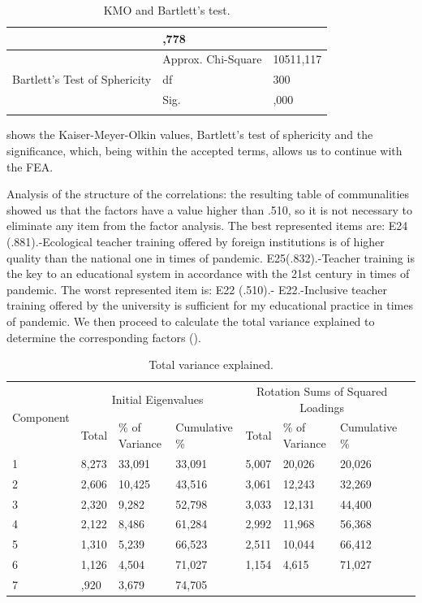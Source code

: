 \documentclass{textolivre}
\begin{document}
\begin{table}[htpb]
\caption{KMO and Bartlett's test.}
\label{tab2}
\centering
\begin{tabular}{p{}p{}p{}}
\toprule 
\arrayrulecolor[gray]{.7}
\multicolumn{2}{c}{Kaiser-Meyer-Olkin Measure of Sampling Adequacy.} & ,778
\\ 
\midrule
\multirow{3}{*}{Bartlett's Test of Sphericity} & Approx. Chi-Square & 10511,117 \\
\cmidrule{2-3}
& df & 300 \\
\cmidrule{2-3}
& Sig. & ,000
\\
\arrayrulecolor{black}
\bottomrule
\end{tabular}
\centering
\end{table}

 shows the Kaiser-Meyer-Olkin values, Bartlett's test of sphericity and the significance, which, being within the accepted terms, allows us to continue with the FEA.
 
Analysis of the structure of the correlations: the resulting table of communalities showed us that the factors have a value higher than .510, so it is not necessary to eliminate any item from the factor analysis. The best represented items are: E24 (.881).-Ecological teacher training offered by foreign institutions is of higher quality than the national one in times of pandemic.
E25(.832).-Teacher training is the key to an educational system in accordance with the 21st century in times of pandemic. The worst represented item is: E22 (.510).- E22.-Inclusive teacher training offered by the university is sufficient for my educational practice in times of pandemic. We then proceed to calculate the total variance explained to determine the corresponding factors ().

\begin{table}[htpb]
\caption{Total variance explained.}
\label{tab3}
\centering
\begin{tabular}{p{}lllllll}
\toprule 
\multirow{2}{*}{Component} & \multicolumn{3}{c}{Initial Eigenvalues} & \multicolumn{3}{c}{Rotation Sums of Squared Loadings} \\ 
\cmidrule{2-4} \cmidrule{5-7}
& Total & \% of Variance & Cumulative \% & Total & \% of Variance & Cumulative \%
\\
\midrule
1 & 8,273 & 33,091 & 33,091 & 5,007 & 20,026 & 20,026 \\
2 & 2,606 & 10,425 & 43,516 & 3,061 & 12,243 & 32,269 \\
3 & 2,320 & 9,282 & 52,798 & 3,033 & 12,131 & 44,400 \\
4 & 2,122 & 8,486 & 61,284 & 2,992 & 11,968 & 56,368 \\
5 & 1,310 & 5,239 & 66,523 & 2,511 & 10,044 & 66,412 \\
6 & 1,126 & 4,504 & 71,027 & 1,154 & 4,615 & 71,027 \\
7 & ,920 & 3,679 & 74,705 & & & \\
\bottomrule
\end{tabular}
\centering
\end{table}
\end{document}
